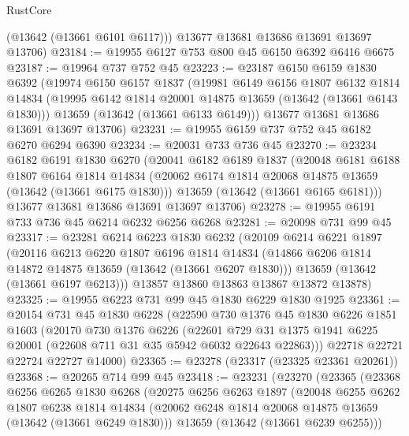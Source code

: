 \begin{lexlean}{RustCore}
\begin{coremodule}
        (@13642 (@13661 @6101 @6117)))
      @13677
      @13681
      @13686
      @13691
      @13697
      @13706)
@23184 := @19955 @6127 @753 @800 @45 @6150 @6392 @6416 @6675
@23187 := @19964 @737 @752 @45
@23223 := @23187
    @6150
    @6159
    @1830
    @6392
    (@19974
      @6150
      @6157
      @1837
      (@19981
        @6149
        @6156
        @1807
        @6132
        @1814
        @14834
        (@19995 @6142 @1814 @20001 @14875 @13659 (@13642 (@13661 @6143 @1830)))
        @13659
        (@13642 (@13661 @6133 @6149)))
      @13677
      @13681
      @13686
      @13691
      @13697
      @13706)
@23231 := @19955 @6159 @737 @752 @45 @6182 @6270 @6294 @6390
@23234 := @20031 @733 @736 @45
@23270 := @23234
    @6182
    @6191
    @1830
    @6270
    (@20041
      @6182
      @6189
      @1837
      (@20048
        @6181
        @6188
        @1807
        @6164
        @1814
        @14834
        (@20062 @6174 @1814 @20068 @14875 @13659 (@13642 (@13661 @6175 @1830)))
        @13659
        (@13642 (@13661 @6165 @6181)))
      @13677
      @13681
      @13686
      @13691
      @13697
      @13706)
@23278 := @19955 @6191 @733 @736 @45 @6214 @6232 @6256 @6268
@23281 := @20098 @731 @99 @45
@23317 := @23281
    @6214
    @6223
    @1830
    @6232
    (@20109
      @6214
      @6221
      @1897
      (@20116
        @6213
        @6220
        @1807
        @6196
        @1814
        @14834
        (@14866 @6206 @1814 @14872 @14875 @13659 (@13642 (@13661 @6207 @1830)))
        @13659
        (@13642 (@13661 @6197 @6213)))
      @13857
      @13860
      @13863
      @13867
      @13872
      @13878)
@23325 := @19955 @6223 @731 @99 @45 @1830 @6229 @1830 @1925
@23361 := @20154
    @731
    @45
    @1830
    @6228
    (@22590
      @730
      @1376
      @45
      @1830
      @6226
      @1851
      @1603
      (@20170
        @730
        @1376
        @6226
        (@22601 @729 @31 @1375 @1941 @6225 @20001 (@22608 @711 @31 @35 @5942 @6032 @22643 @22863)))
      @22718
      @22721
      @22724
      @22727
      @14000)
@23365 := @23278 (@23317 (@23325 @23361 @20261))
@23368 := @20265 @714 @99 @45
@23418 := @23231
    (@23270
      (@23365
        (@23368
          @6256
          @6265
          @1830
          @6268
          (@20275
            @6256
            @6263
            @1897
            (@20048
              @6255
              @6262
              @1807
              @6238
              @1814
              @14834
              (@20062 @6248 @1814 @20068 @14875 @13659 (@13642 (@13661 @6249 @1830)))
              @13659
              (@13642 (@13661 @6239 @6255)))

\end{coremodule}
\end{lexlean}
